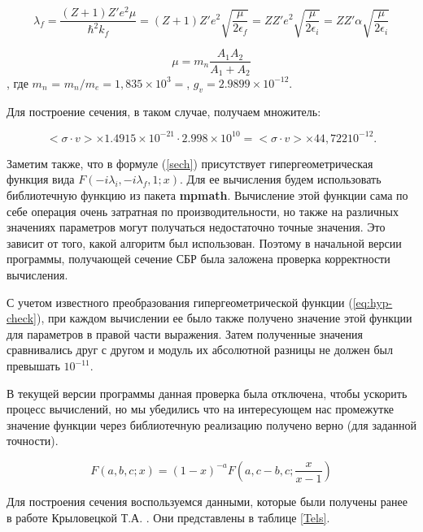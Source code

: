 \documentclass[%
master,    %
natbib,      %
subf,        %
href,        %
colorlinks,  %
]{disser}
\begin{document}
\begin{equation}
\lambda_f = \frac{(Z+1) Z'  e^2 \mu}{\hbar^2 k_f} = (Z + 1)Z' e^2 \sqrt{\frac{\mu}{2 \epsilon_f}} = Z Z' e^2 \sqrt{\frac{\mu}{2 \epsilon_i}} = Z Z' \alpha \sqrt{\frac{\mu}{2 \epsilon_i}}
\end{equation}

\begin{equation}
\mu = m_n \frac{A_1 A_2}{A_1 + A_2}
\end{equation}
, где $m_n$ =  $m_n/m_e = 1,835\times10^3 =$, $g_v = 2.9899 \times 10^{-12}$.

Для построение сечения, в таком случае, получаем множитель:

$$
	<\sigma \cdot v> \times 1.4915 \times 10^{-21} \cdot 2.998 \times 10^{10} = 	<\sigma \cdot v> \times 44,722 10^{-12}.
$$

Заметим также, что в формуле (\ref{sech}) присутствует гипергеометрическая функция вида $F(-i\lambda_i,-i\lambda_f,1;x)$. Для ее вычисления будем использовать библиотечную функцию из пакета \textbf{mpmath}. Вычисление этой функции сама по себе операция очень затратная по производительности, но также на различных значениях параметров могут получаться недостаточно точные значения. Это зависит от того, какой алгоритм был использован. Поэтому в начальной версии программы, получающей сечение СБР была заложена проверка корректности вычисления. 

С учетом известного преобразования гипергеометрической функции (\ref{eq:hyp-check}), при каждом вычислении ее было также получено значение этой функции для параметров в правой части выражения. Затем полученные значения сравнивались друг с другом и модуль их абсолютной разницы не должен был превышать $10^{-11}$. 

В текущей версии программы данная проверка была отключена, чтобы ускорить процесс вычислений, но мы убедились что на интересующем нас промежутке значение функции через библиотечную реализацию получено верно (для заданной точности).

\begin{equation}
\label{eq:hyp-check}
F(a,b,c;x) = (1-x)^{-a}F\left(a,c-b,c; \frac{x}{x-1}\right)
\end{equation}

Для построения сечения воспользуемся данными, которые были получены ранее в работе Крыловецкой Т.А. \cite{tak}. Они представлены в таблице \ref{Tels}.
\end{document}
